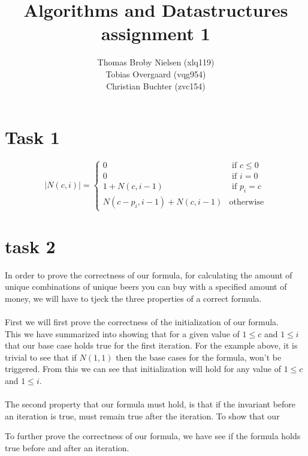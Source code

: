 \documentclass[12pt]{article}
\title{Algorithms and Datastructures assignment 1}
\author{Thomas Broby Nielsen (xlq119)\\ Tobias Overgaard (vqg954)\\ Christian Buchter (zvc154)}
\begin{document}
\maketitle

\tableofcontents

\pagebreak
\section{Task 1}
$$
|N(c,i)| = \left\{ \begin{array}{rl}
0 &\mbox{ if $c \leq 0$} \\
0 &\mbox{ if $i=0$} \\
1+N(c,i-1) &\mbox{ if $p_i=c$}\\
N(c-p_i,i-1)+N(c,i-1) &\mbox{otherwise}
\end{array} \right.
$$

\section{task 2}
In order to prove the correctness of our formula, for calculating the amount of unique combinations of unique beers you can buy with a specified amount of money, we will have to tjeck the three properties of a correct formula.
 \\ \\
First we will first prove the correctness of the initialization of our formula.
\\
This we have summarized into showing that for a given value of $1 \leq c$ and $1 \leq i$ that our base case holds true for the first iteration.
For the example above, it is trivial to see that if $N(1,1)$ then the base cases for the formula, won't be triggered. From this we can see that initialization will hold for any value of $1 \leq c$ and $1 \leq i$.
\\  \\
The second property that our formula must hold, is that if the invariant before an iteration is true, must remain true after the iteration. To show that our 

To further prove the correctness of our formula, we have see if the formula holds true before and after an iteration. 
\end{document}
